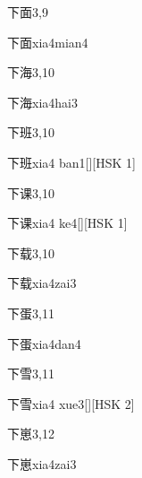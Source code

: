 \begin{entry}{下面}{3,9}
  \begin{phonetics}{下面}{xia4mian4}
  \end{phonetics}
\end{entry}

\begin{entry}{下海}{3,10}
  \begin{phonetics}{下海}{xia4hai3}
  \end{phonetics}
\end{entry}

\begin{entry}{下班}{3,10}
  \begin{phonetics}{下班}{xia4 ban1}[][HSK 1]
  \end{phonetics}
\end{entry}

\begin{entry}{下课}{3,10}
  \begin{phonetics}{下课}{xia4 ke4}[][HSK 1]
  \end{phonetics}
\end{entry}

\begin{entry}{下载}{3,10}
  \begin{phonetics}{下载}{xia4zai3}
  \end{phonetics}
\end{entry}

\begin{entry}{下蛋}{3,11}
  \begin{phonetics}{下蛋}{xia4dan4}
  \end{phonetics}
\end{entry}

\begin{entry}{下雪}{3,11}
  \begin{phonetics}{下雪}{xia4 xue3}[][HSK 2]
  \end{phonetics}
\end{entry}

\begin{entry}{下崽}{3,12}
  \begin{phonetics}{下崽}{xia4zai3}
  \end{phonetics}
\end{entry}

